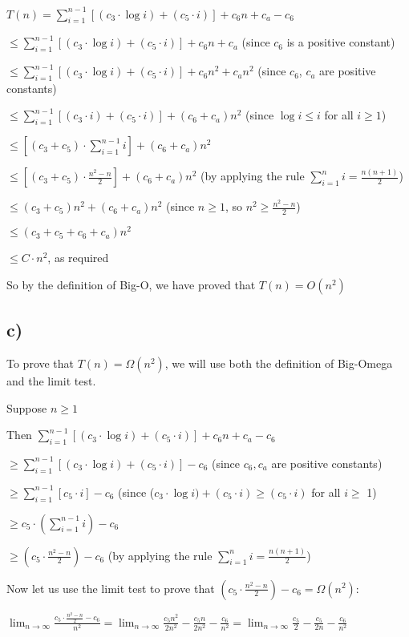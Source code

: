 \documentclass{article}
\begin{document}
$T(n) = \sum_{i=1}^{n-1} [(c_3 \cdot \log i) + (c_5 \cdot i)] + c_6n + c_a - c_6 $

$\leq \sum_{i=1}^{n-1} [(c_3 \cdot \log i) + (c_5 \cdot i)] + c_6n + c_a$ \; \; \; (since $c_6$ is a positive constant)

$\leq \sum_{i=1}^{n-1} [(c_3 \cdot \log i) + (c_5 \cdot i)] + c_6n^2 + c_an^2$ \;\; (since $c_6$, $c_a$ are positive constants)

$\leq \sum_{i=1}^{n-1} [(c_3 \cdot i) + (c_5 \cdot i)] + (c_6+c_a)n^2$ \;\;\;(since $\log i \leq i$ for all $i \geq 1$)

$\leq [(c_3 + c_5) \cdot \sum_{i=1}^{n-1} i] + (c_6+c_a)n^2 $  

$\leq [(c_3 + c_5) \cdot \frac{n^2-n}{2}] + (c_6+c_a)n^2 $ \; (by applying the rule $\sum_{i=1}^{n} i = \frac{n(n+1)}{2}$)

$\leq (c_3 + c_5)n^2 + (c_6+c_a)n^2 $   \;\;\;  (since $n \geq 1$, so $n^2 \geq \frac{n^2-n}{2}$)

$\leq (c_3+c_5+c_6+c_a)n^2$

$\leq C \cdot n^2$,\; as required

So by the definition of Big-O, we have proved that $T(n) = O(n^2)$


\subsection*{c)}
To prove that $T(n) = \Omega(n^2)$, we will use both the definition of Big-Omega and the limit test.

Suppose $n \geq 1$

Then $\sum_{i=1}^{n-1} [(c_3 \cdot \log i) + (c_5 \cdot i)] + c_6n + c_a - c_6$

$\geq \sum_{i=1}^{n-1} [(c_3 \cdot \log i) + (c_5 \cdot i)] - c_6$ \; (since $c_6,c_a$ are positive constants)

$\geq \sum_{i=1}^{n-1} [c_5 \cdot i] - c_6$  \; (since ($c_3 \cdot \log i) + (c_5 \cdot i) \geq (c_5 \cdot i)$ for all $i \geq$ 1)

$\geq c_5 \cdot (\sum_{i=1}^{n-1} i) - c_6$

$\geq (c_5 \cdot \frac{n^2-n}{2}) - c_6$ \; \; (by applying the rule $\sum_{i=1}^{n} i = \frac{n(n+1)}{2}$)


Now let us use the limit test to prove that $(c_5 \cdot \frac{n^2-n}{2}) - c_6 = \Omega(n^2)$:

$\lim_{n\to\infty} \frac{c_5 \cdot \frac{n^2-n}{2} - c_6}{n^2}
= \lim_{n\to\infty} \frac{c_5n^2}{2n^2} - \frac{c_5n}{2n^2} - \frac{c_6}{n^2}
= \lim_{n\to\infty} \frac{c_5}{2} - \frac{c_5}{2n} - \frac{c_6}{n^2}$
\end{document}
